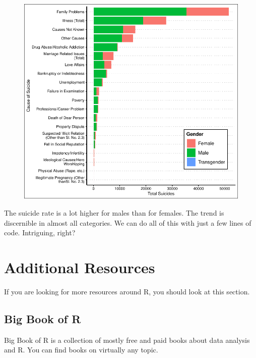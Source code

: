 \documentclass[
  letterpaper,
  DIV=11,
  numbers=noendperiod]{scrartcl}
\begin{document}
\begin{figure}[H]

{\centering \includegraphics{file_files/figure-pdf/unnamed-chunk-9-1.pdf}

}

\end{figure}

The suicide rate is a lot higher for males than for females. The trend
is discernible in almost all categories. We can do all of this with just
a few lines of code. Intriguing, right?

\hypertarget{additional-resources}{%
\section{Additional Resources}\label{additional-resources}}

If you are looking for more resources around R, you should look at this
section.

\hypertarget{big-book-of-r}{%
\subsection{Big Book of R}\label{big-book-of-r}}

Big Book of R is a collection of mostly free and paid books about data
analysis and R. You can find books on virtually any topic.
\end{document}
